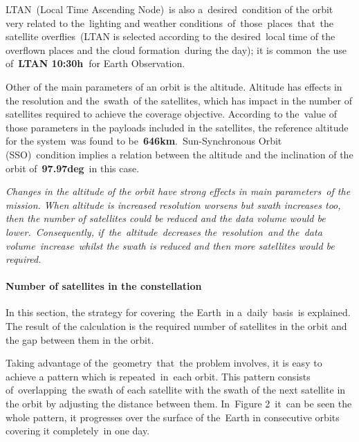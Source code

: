 \documentclass[a4paper]{article}
\begin{document}
LTAN\ (Local Time Ascending Node)\ is also a\ desired\ condition of the
orbit very related to the\ lighting and weather
conditions\ of\ those\ places\ that\ the satellite overflies\ (LTAN is
selected according to the desired\ local time of the overflown places
and the cloud formation\ during the day); it is common\ the use
of\ \textbf{LTAN 10:30h}\textbf{\ }for Earth Observation.\ 


\bigskip

Other of the main parameters of an orbit is the altitude. Altitude has
effects in the resolution and the\ swath\ of the satellites, which has
impact in the number of satellites required to achieve the coverage
objective. According to the\ value of those parameters in the payloads
included in the satellites, the reference altitude for the system\ was
found to be\ \textbf{646km}.\ Sun-Synchronous Orbit (SSO)\ condition
implies a relation between the altitude and the inclination of the
orbit of\ \textbf{97.97}\textbf{deg}\ in this case.


\bigskip

{\itshape
Changes in the altitude of the orbit have strong effects in main
parameters\ of the mission. When altitude is increased resolution
worsens but swath increases too, then the number of satellites could be
reduced and the data volume would be lower.\ Consequently,
if\ the\ altitude\ decreases the\ resolution\ and the\ data
volume\ increase\ whilst the swath is reduced and then more satellites
would be required.}


\bigskip

\paragraph[Number of satellites in the constellation]{Number of
satellites in the constellation}
\label{bkm:Ref376938057}
\bigskip

In this section, the strategy for covering\ the Earth\ in
a\ daily\ basis\ is explained. The result of the calculation is the
required number of satellites in the orbit and the gap between them in
the orbit.\ 

Taking advantage of the\ geometry\ that\ the problem involves, it is
easy to achieve a pattern which is repeated\ in\ each orbit. This
pattern consists of\ overlapping\ the swath of each satellite with the
swath of the next satellite in the orbit by adjusting the distance
between them. In\ Figure 2\ it\ can be seen the whole pattern, it
progresses over the surface of the\ Earth in consecutive orbits
covering it completely\ in one day.
\end{document}
